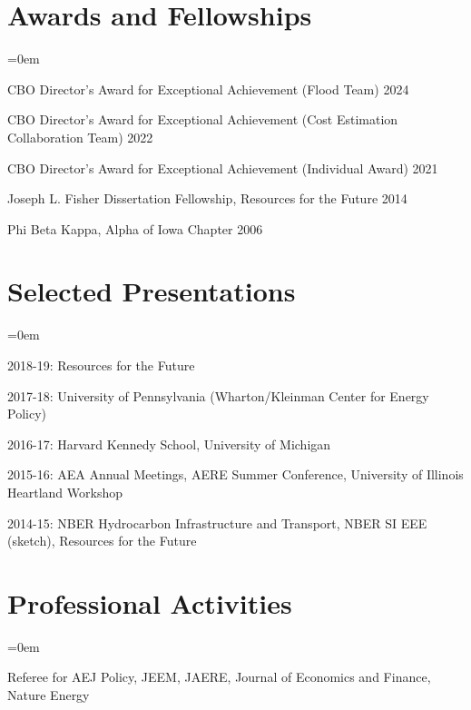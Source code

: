 \documentclass[letterpaper]{article}
\renewenvironment{itemize}{
  \vspace{-0.5em}
  \begin{list}{}{
	\itemsep=0em
    \setlength{\leftmargin}{1.5em}
  }
}{
  \end{list}
}
\begin{document}
\section*{Awards and Fellowships}
\begin{itemize}
\item CBO Director's Award for Exceptional Achievement (Flood Team) \hfill 2024
\item CBO Director's Award for Exceptional Achievement (Cost Estimation Collaboration Team) \hfill 2022
\item CBO Director's Award for Exceptional Achievement (Individual Award) \hfill 2021
\item Joseph L. Fisher Dissertation Fellowship, Resources for the Future	\hfill 2014
\item Phi Beta Kappa, Alpha of Iowa Chapter	\hfill 2006
\end{itemize}

\section*{Selected Presentations}
\begin{itemize}
	\item 2018-19: Resources for the Future
	\item 2017-18: University of Pennsylvania (Wharton/Kleinman Center for Energy Policy)
	\item 2016-17: Harvard Kennedy School, University of Michigan
	\item 2015-16: AEA Annual Meetings, AERE Summer Conference, University of Illinois Heartland Workshop
	\item 2014-15: NBER Hydrocarbon Infrastructure and Transport, NBER SI EEE (sketch), Resources for the Future
\end{itemize}

\section*{Professional Activities}
\begin{itemize}
\item Referee for AEJ Policy, JEEM, JAERE, Journal of Economics and Finance, Nature Energy
\end{itemize}
\end{document}
